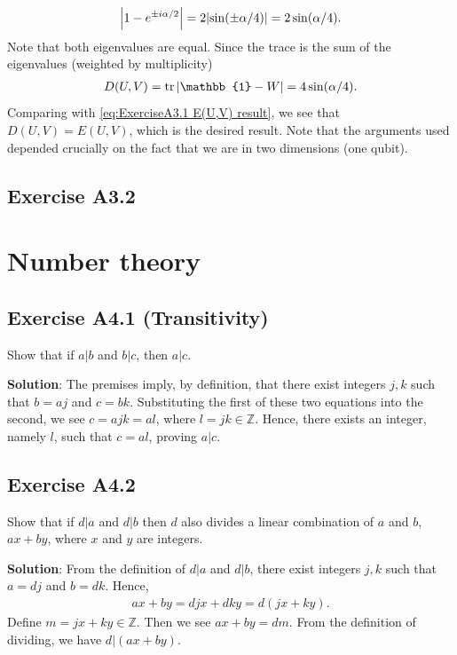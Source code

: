 \documentclass{book}
\begin{document}
    \begin{align}
        \abs{1-e^{\pm i\alpha/2}} = 2\abs{\sin(\pm \alpha/4)} = 2 \sin (\alpha/4).
    \end{align}
    Note that both eigenvalues are equal. Since the trace is the sum of the eigenvalues (weighted by multiplicity)
    \begin{align}
        D(U,V) = \tr \abs{\mathbb{1}-W} = 4\sin(\alpha/4).
    \end{align}
    Comparing with \eqref{eq:ExerciseA3.1 E(U,V) result}, we see that $D(U,V) = E(U,V)$, which is the desired result. Note that the arguments used depended crucially on the fact that we are in two dimensions (one qubit).
    
\section*{Exercise A3.2}

\chapter{Number theory}


\section*{Exercise A4.1 (Transitivity)}
    Show that if $a|b$ and $b|c$, then $a|c$.
    
    \textbf{Solution}: The premises imply, by definition, that there exist integers $j, k$ such that $b = a j$ and $c = b k$. Substituting the first of these two equations into the second, we see $c = a j k = a l$, where $l = j k \in \mathbb{Z}$. Hence, there exists an integer, namely $l$, such that $c = a l$, proving $a |c$.

\section*{Exercise A4.2}
    Show that if $d|a$ and $d|b$ then $d$ also divides a linear combination of $a$ and $b$, $ax+by$, where $x$ and $y$ are integers.
    
    \textbf{Solution}: From the definition of $d|a$ and $d|b$, there exist integers $j, k $ such that $a = d j$ and $b= dk$. Hence,
    \begin{align}
        ax + by = djx + dky = d(jx + ky).
    \end{align}
    Define $m = jx +ky \in \mathbb{Z}$. Then we see $ax + by = dm$. From the definition of dividing, we have $d|(ax+by)$. 
\end{document}
